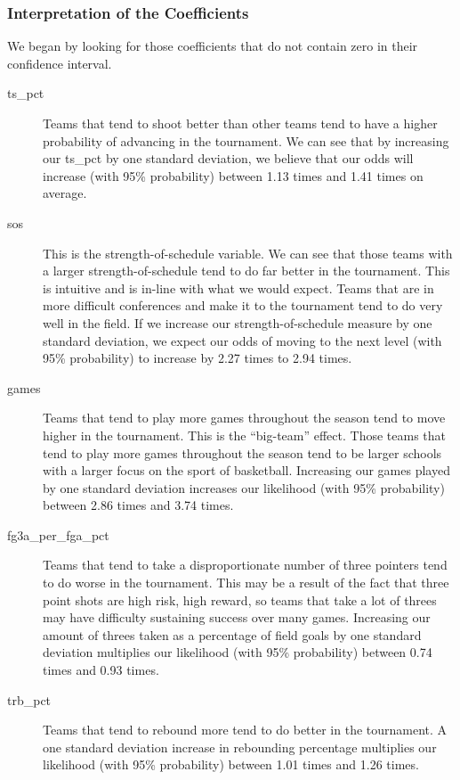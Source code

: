 \documentclass[10pt,a4paper, hidelinks]{article} %
\begin{document}

\subsubsection{Interpretation of the Coefficients}

We began by looking for those coefficients that do not contain zero in their confidence interval.

\begin{description}
	\item[ts\_pct] Teams that tend to shoot better than other teams tend to have a higher probability of advancing in the tournament. We can see that by increasing our ts\_pct by one standard deviation, we believe that our odds will increase  (with 95\% probability)  between 1.13 times and 1.41 times on average. 
	\item[sos] This is the strength-of-schedule variable. We can see that those teams with a larger strength-of-schedule tend to do far better in the tournament. This is intuitive and is in-line with what we would expect. Teams that are in more difficult conferences and make it to the tournament tend to do very well in the field.  If we increase our strength-of-schedule measure by one standard deviation, we expect our odds of moving to the next level (with 95\% probability) to increase by 2.27 times to 2.94 times.
	\item[games] Teams that tend to play more games throughout the season tend to move higher in the tournament. This is the ``big-team'' effect. Those teams that tend to play more games throughout the season tend to be larger schools with a larger focus on the sport of basketball. Increasing our games played by one standard deviation increases our likelihood (with 95\% probability) between 2.86 times and 3.74 times. 
	\item[fg3a\_per\_fga\_pct] Teams that tend to take a disproportionate number of three pointers tend to do worse in the tournament. This may be a result of the fact that three point shots are high risk, high reward, so teams that take a lot of threes may have difficulty sustaining success over many games. Increasing our amount of threes taken as a percentage of field goals by one standard deviation multiplies our likelihood (with 95\% probability) between 0.74 times and 0.93 times. 
	\item[trb\_pct] Teams that tend to rebound more tend to do better in the tournament. A one standard deviation increase in rebounding percentage multiplies our likelihood (with 95\% probability) between 1.01 times and 1.26 times. 
\end{description}
\end{document}
